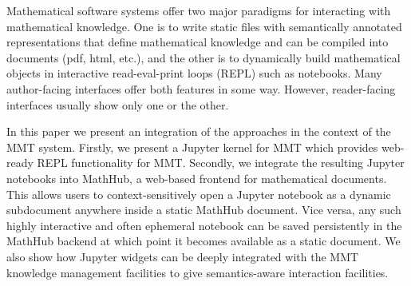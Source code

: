 Mathematical software systems offer two major paradigms for interacting with mathematical knowledge.
One is to write static files with semantically annotated representations that define mathematical knowledge and can be compiled into documents (pdf, html, etc.), and the other is to dynamically build mathematical objects in interactive read-eval-print loops (REPL) such as notebooks.
Many author-facing interfaces offer both features in some way.
However, reader-facing interfaces usually show only one or the other.

In this paper we present an integration of the approaches in the context of the MMT system.
Firstly, we present a Jupyter kernel for MMT which provides web-ready REPL functionality for MMT.
Secondly, we integrate the resulting Jupyter notebooks into MathHub, a web-based frontend for mathematical documents.
This allows users to context-sensitively open a Jupyter notebook as a dynamic subdocument anywhere inside a static MathHub document.
Vice versa, any such highly interactive and often ephemeral notebook can be saved persistently in the MathHub backend at which point it becomes available as a static document.
We also show how Jupyter widgets can be deeply integrated with the MMT knowledge management facilities to give semantics-aware interaction facilities.


